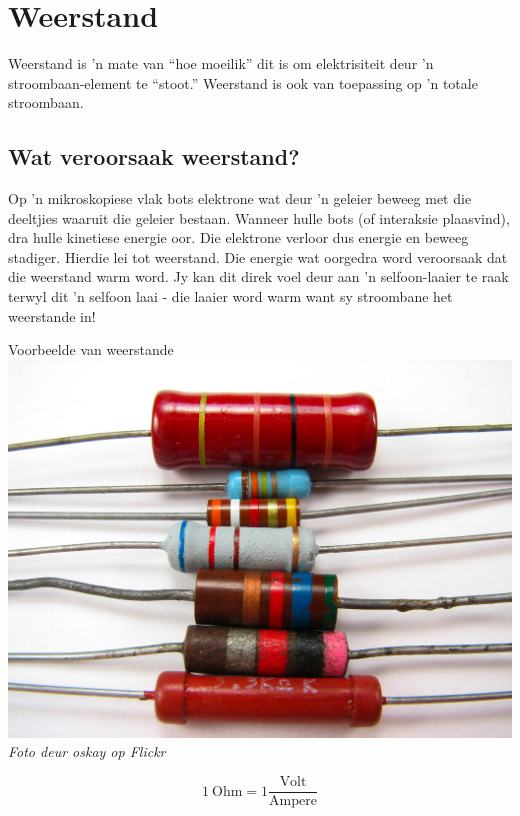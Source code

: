 \section{Weerstand}

Weerstand is  'n mate van ``hoe moeilik'' dit is om elektrisiteit deur 'n
stroombaan-element te ``stoot.'' Weerstand is ook van toepassing op  'n totale
stroombaan.
\subsection*{Wat veroorsaak weerstand?}

\begin{minipage}{.5\textwidth}
Op  'n mikroskopiese vlak bots elektrone wat deur  'n geleier beweeg met die
deeltjies waaruit die geleier bestaan. Wanneer hulle bots (of interaksie
plaasvind), dra hulle kinetiese energie oor. Die elektrone verloor dus energie
en beweeg stadiger. Hierdie lei tot weerstand. Die energie wat oorgedra word
veroorsaak dat die weerstand warm word.
Jy kan dit direk voel deur aan  'n selfoon-laaier te raak terwyl dit  'n selfoon
laai - die laaier word warm want sy stroombane het weerstande in!
\end{minipage}
\begin{minipage}{.5\textwidth}
\begin{center}
 Voorbeelde van weerstande\\
\includegraphics[width=.8\textwidth]{photos/resistors_oskay.jpg}\\
\textit{Foto deur oskay op Flickr}
\end{center}
\end{minipage}

\begin{equation*}
1 \ \text{Ohm} = 1 \frac{\text{Volt}}{ \text{Ampere}}
\end{equation*}


